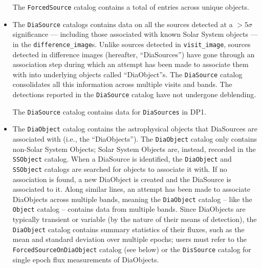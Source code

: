 \begin{itemize}
The \texttt{ForcedSource} catalog contains a total of \nforcedsources entries across \nforcedobjects unique objects.


\item The \texttt{DiaSource} catalogs \citep{10.71929/rubin/2570317} contains data on all the sources detected at a $>5\sigma$ significance --- including those associated with known Solar System objects --- in the \texttt{difference\_image}s.
Unlike sources detected in \texttt{visit\_image}, sources detected in difference images (hereafter, ``DiaSources'') have gone through an association step during which an attempt has been made to associate them with into underlying objects called ``DiaObject''s. The \texttt{DiaSource} catalog consolidates all this information across multiple visits and bands. The detections reported in the \texttt{DiaSource} catalog have not undergone deblending.

The \texttt{DiaSource} catalog contains data for \ndiasources \texttt{DiaSources} in \gls{DP1}.


\item The \texttt{DiaObject} catalog \citep{10.71929/rubin/2570319} contains the astrophysical objects that DiaSources are associated with (i.e., the ``DiaObjects'').
The \texttt{DiaObject} catalog only contains non-Solar System Objects; Solar System Objects are, instead, recorded in the \texttt{SSObject} catalog.
When a DiaSource is identified, the \texttt{DiaObject} and \texttt{SSObject} catalogs are searched for objects to associate it with.
If no association is found, a new DiaObject is created and the DiaSource is associated to it.
Along similar lines, an attempt has been made to associate DiaObjects across multiple bands, meaning the \texttt{DiaObject} catalog -- like the \texttt{Object} catalog -- contains data from multiple bands.
Since DiaObjects are typically \gls{transient} or variable (by the nature of their means of detection), the \texttt{DiaObject} catalog contains summary statistics of their fluxes, such as the mean and standard deviation over multiple epochs; users must refer to the \texttt{ForcedSourceOnDiaObject} catalog (see below) or the \texttt{DisSource} catalog for single \gls{epoch} \gls{flux} measurements of DiaObjects.


\end{itemize}
